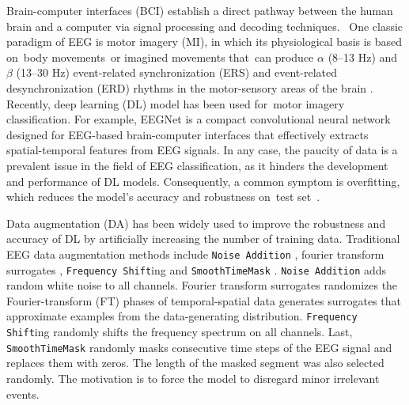 \documentclass[runningheads]{llncs}
\begin{document}
Brain-computer interfaces (BCI) establish a direct pathway between the human brain and a computer via signal processing and decoding techniques.  One classic paradigm of EEG is motor imagery (MI), in which its physiological basis is based on body movements or imagined movements that can produce $\alpha$ (8–13 Hz) and $\beta$ (13–30 Hz) event-related synchronization (ERS) and event-related desynchronization (ERD) rhythms in the motor-sensory areas of the brain \cite{wolpaw2013brain}. Recently, deep learning (DL) model has been used for motor imagery classification. For example, EEGNet \cite{lawhern2018eegnet} is a compact convolutional neural network designed for EEG-based brain-computer interfaces that effectively extracts spatial-temporal features from EEG signals. In any case, the paucity of data is a prevalent issue in the field of EEG classification, as it hinders the development and performance of DL models.  Consequently, a common symptom is overfitting, which reduces the model's accuracy and robustness on test set \cite{bilbao2017overfitting}. 

Data augmentation (DA) has been widely used to improve the robustness and accuracy of DL by artificially increasing the number of training data.  Traditional EEG data augmentation methods include \texttt{Noise Addition} \cite{wang2018data,parvan2019transfer,li2019channel}, fourier transform surrogates \cite{schwabedal2018addressing}, \texttt{Frequency Shift}ing \cite{rommel2021cadda,rommel2022data} and \texttt{\texttt{SmoothTimeMask}} \cite{mohsenvand2020contrastive}. 
\texttt{Noise Addition} \cite{li2019channel,parvan2019transfer} adds random white noise to all channels.  Fourier transform surrogates \cite{schwabedal2018addressing} randomizes the Fourier-transform (FT) phases of temporal-spatial data generates surrogates that approximate examples from the data-generating distribution. \texttt{Frequency Shift}ing \cite{rommel2021cadda,rommel2022data} randomly shifts the frequency spectrum on all channels. Last, \texttt{\texttt{SmoothTimeMask}} \cite{mohsenvand2020contrastive} randomly masks consecutive time steps of the EEG signal and replaces them with zeros. The length of the masked segment was also selected randomly.   The motivation is to force the model to disregard minor irrelevant events.
\end{document}

